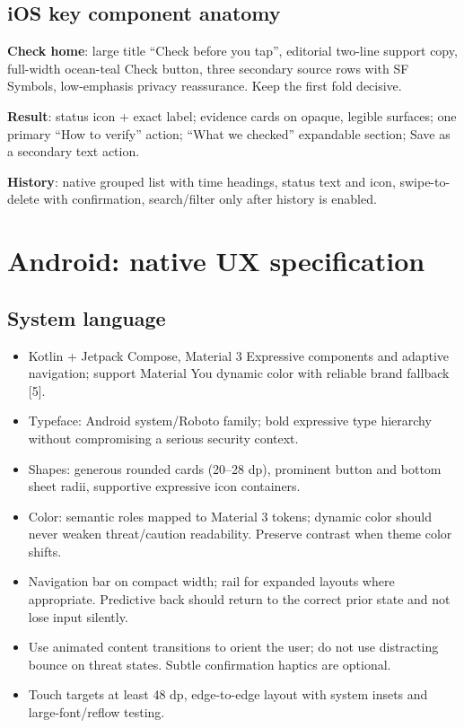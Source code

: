 \documentclass[10pt,a4paper]{article}
\begin{document}
\subsection{iOS key component anatomy}
\begin{featurebox}
\textbf{Check home}: large title ``Check before you tap'', editorial two-line support copy, full-width ocean-teal Check button, three secondary source rows with SF Symbols, low-emphasis privacy reassurance. Keep the first fold decisive.\par
\textbf{Result}: status icon + exact label; evidence cards on opaque, legible surfaces; one primary ``How to verify'' action; ``What we checked'' expandable section; Save as a secondary text action.\par
\textbf{History}: native grouped list with time headings, status text and icon, swipe-to-delete with confirmation, search/filter only after history is enabled.
\end{featurebox}

\section{Android: native UX specification}
\subsection{System language}
\begin{itemize}
\item Kotlin + Jetpack Compose, Material 3 Expressive components and adaptive navigation; support Material You dynamic color with reliable brand fallback [5].
\item Typeface: Android system/Roboto family; bold expressive type hierarchy without compromising a serious security context.
\item Shapes: generous rounded cards (20--28 dp), prominent button and bottom sheet radii, supportive expressive icon containers.
\item Color: semantic roles mapped to Material 3 tokens; dynamic color should never weaken threat/caution readability. Preserve contrast when theme color shifts.
\item Navigation bar on compact width; rail for expanded layouts where appropriate. Predictive back should return to the correct prior state and not lose input silently.
\item Use animated content transitions to orient the user; do not use distracting bounce on threat states. Subtle confirmation haptics are optional.
\item Touch targets at least 48 dp, edge-to-edge layout with system insets and large-font/reflow testing.
\end{itemize}
\end{document}
